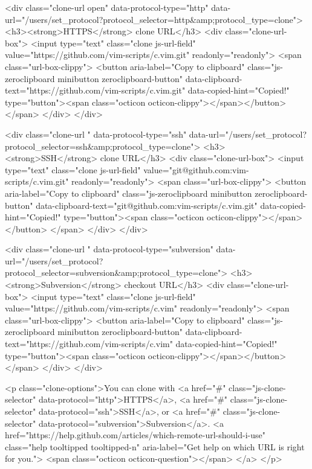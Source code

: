   

<div class="clone-url open"
  data-protocol-type="http"
  data-url="/users/set_protocol?protocol_selector=http&amp;protocol_type=clone">
  <h3><strong>HTTPS</strong> clone URL</h3>
  <div class="clone-url-box">
    <input type="text" class="clone js-url-field"
           value="https://github.com/vim-scripts/c.vim.git" readonly="readonly">
    <span class="url-box-clippy">
    <button aria-label="Copy to clipboard" class="js-zeroclipboard minibutton zeroclipboard-button" data-clipboard-text="https://github.com/vim-scripts/c.vim.git" data-copied-hint="Copied!" type="button"><span class="octicon octicon-clippy"></span></button>
    </span>
  </div>
</div>

  

<div class="clone-url "
  data-protocol-type="ssh"
  data-url="/users/set_protocol?protocol_selector=ssh&amp;protocol_type=clone">
  <h3><strong>SSH</strong> clone URL</h3>
  <div class="clone-url-box">
    <input type="text" class="clone js-url-field"
           value="git@github.com:vim-scripts/c.vim.git" readonly="readonly">
    <span class="url-box-clippy">
    <button aria-label="Copy to clipboard" class="js-zeroclipboard minibutton zeroclipboard-button" data-clipboard-text="git@github.com:vim-scripts/c.vim.git" data-copied-hint="Copied!" type="button"><span class="octicon octicon-clippy"></span></button>
    </span>
  </div>
</div>

  

<div class="clone-url "
  data-protocol-type="subversion"
  data-url="/users/set_protocol?protocol_selector=subversion&amp;protocol_type=clone">
  <h3><strong>Subversion</strong> checkout URL</h3>
  <div class="clone-url-box">
    <input type="text" class="clone js-url-field"
           value="https://github.com/vim-scripts/c.vim" readonly="readonly">
    <span class="url-box-clippy">
    <button aria-label="Copy to clipboard" class="js-zeroclipboard minibutton zeroclipboard-button" data-clipboard-text="https://github.com/vim-scripts/c.vim" data-copied-hint="Copied!" type="button"><span class="octicon octicon-clippy"></span></button>
    </span>
  </div>
</div>


<p class="clone-options">You can clone with
      <a href="#" class="js-clone-selector" data-protocol="http">HTTPS</a>,
      <a href="#" class="js-clone-selector" data-protocol="ssh">SSH</a>,
      or <a href="#" class="js-clone-selector" data-protocol="subversion">Subversion</a>.
  <a href="https://help.github.com/articles/which-remote-url-should-i-use" class="help tooltipped tooltipped-n" aria-label="Get help on which URL is right for you.">
    <span class="octicon octicon-question"></span>
  </a>
</p>


